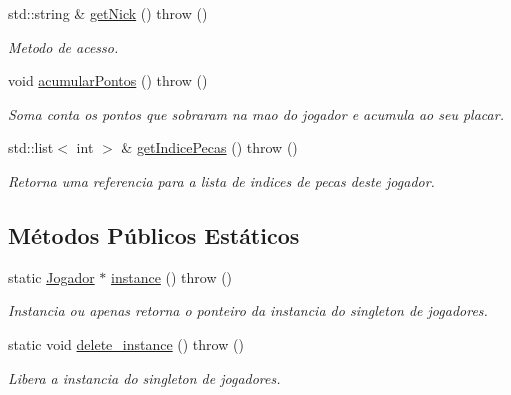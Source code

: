 \begin{DoxyCompactItemize}
std::string \& \hyperlink{classJogador_a28dda560df2901fe50879e3db38b049e}{getNick} ()  throw ()
\begin{DoxyCompactList}\small\item\em Metodo de acesso. \item\end{DoxyCompactList}\item 
\hypertarget{classJogador_a8a53830073199caffe60e9d048b2b149}{
void \hyperlink{classJogador_a8a53830073199caffe60e9d048b2b149}{acumularPontos} ()  throw ()}
\label{classJogador_a8a53830073199caffe60e9d048b2b149}

\begin{DoxyCompactList}\small\item\em Soma conta os pontos que sobraram na mao do jogador e acumula ao seu placar. \item\end{DoxyCompactList}\item 
std::list$<$ int $>$ \& \hyperlink{classJogador_a9443baea87ab6a121f9c0eb972b2a215}{getIndicePecas} ()  throw ()
\begin{DoxyCompactList}\small\item\em Retorna uma referencia para a lista de indices de pecas deste jogador. \item\end{DoxyCompactList}\end{DoxyCompactItemize}
\subsection*{Métodos Públicos Estáticos}
\begin{DoxyCompactItemize}
\item 
static \hyperlink{classJogador}{Jogador} $\ast$ \hyperlink{classJogador_ae7fa7dab6eb891becc88e50f8c418599}{instance} ()  throw ()
\begin{DoxyCompactList}\small\item\em Instancia ou apenas retorna o ponteiro da instancia do singleton de jogadores. \item\end{DoxyCompactList}\item 
\hypertarget{classJogador_a932bd3da3233fca665597ee3de31f34a}{
static void \hyperlink{classJogador_a932bd3da3233fca665597ee3de31f34a}{delete\_\-instance} ()  throw ()}
\label{classJogador_a932bd3da3233fca665597ee3de31f34a}

\begin{DoxyCompactList}\small\item\em Libera a instancia do singleton de jogadores. \item\end{DoxyCompactList}\end{DoxyCompactItemize}


